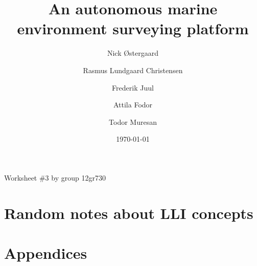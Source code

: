 
\usepackage{bytefield}



\frontmatter
\author{Nick Østergaard \and Rasmus Lundgaard Christensen \and Frederik Juul \and Attila Fodor \and Todor Muresan}
\title{An autonomous marine environment surveying platform}
\date{\today}
\maketitle
\begin{center}
Worksheet \#3 by group 12gr730
\end{center}



\cleardoublepage
%
%
%

\cleardoublepage
\tableofcontents


\mainmatter










\chapter{Random notes about LLI concepts}





\backmatter
\chapter{Appendices}


\label{appendices:bow thruster schematic}

\label{ch:litt}




